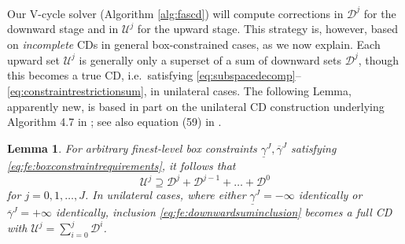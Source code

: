 \documentclass[letterpaper,final,12pt,reqno]{amsart}
\theoremstyle{cstyle}
\newtheorem{lemma}[theorem]{Lemma}
\theoremstyle{cstyle*}
\theoremstyle{dstyle}
\numberwithin{equation}{section}
\numberwithin{figure}{section}
\numberwithin{table}{section}
\numberwithin{theorem}{section}
\begin{document}
Our V-cycle solver (Algorithm \ref{alg:fascd}) will compute corrections in $\mathcal{D}^j$ for the downward stage and in $\mathcal{U}^j$ for the upward stage. This strategy is, however, based on \emph{incomplete} CDs in general box-constrained cases, as we now explain.  Each upward set $\mathcal{U}^j$ is generally only a superset of a sum of downward sets $\mathcal{D}^j$, though this becomes a true CD, i.e.~satisfying \eqref{eq:subspacedecomp}--\eqref{eq:constraintrestrictionsum}, in unilateral cases.  The following Lemma, apparently new, is based in part on the unilateral CD construction underlying Algorithm 4.7 in \cite{GraeserKornhuber2009}; see also equation (59) in \cite{Tai2003}.

\begin{lemma}  \label{lem:downwardadmissibility}  For arbitrary finest-level box constraints $\underline{\gamma}^J,\overline{\gamma}^J$ satisfying \eqref{eq:fe:boxconstraintrequirements}, it follows that
\begin{equation}
\mathcal{U}^j \supseteq \mathcal{D}^j + \mathcal{D}^{j-1} + \dots + \mathcal{D}^0 \label{eq:fe:downwardsuminclusion}
\end{equation}
for $j=0,1,\dots,J$.  In unilateral cases, where either $\underline{\gamma}^J=-\infty$ identically or $\overline{\gamma}^J=+\infty$ identically, inclusion \eqref{eq:fe:downwardsuminclusion} becomes a full CD with $\mathcal{U}^j=\sum_{i=0}^j \mathcal{D}^i$.
\end{lemma}
\end{document}
